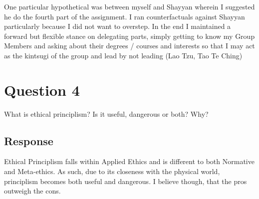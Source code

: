 \documentclass{scrartcl}
\begin{document}
\begin{center}
\end{center}

One particular hypothetical was between myself and Shayyan wherein I suggested he do the fourth part of the assignment. I ran counterfactuals against Shayyan particularly because I did not want to overstep. In the end I maintained a forward but flexible stance on delegating parts, simply getting to know my Group Members and asking about their degrees / courses and interests so that I may act as the kintsugi of the group and lead by not leading (Lao Tzu, Tao Te Ching)

\newpage
\section{Question 4}
\begin{tcolorbox}[colback=white,colframe=purple, sharp corners]
    What is ethical principlism? Is it useful, dangerous or both? Why?
\end{tcolorbox}

\subsection{Response}
Ethical Principlism falls within Applied Ethics and is different to both Normative and Meta-ethics. As such, due to its closeness with the physical world, principlism becomes both useful and dangerous. I believe though, that the pros outweigh the cons.
\end{document}
